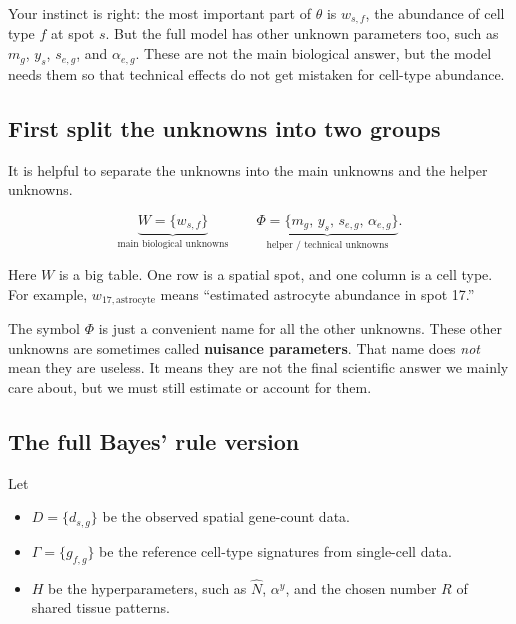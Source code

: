 \documentclass[11pt]{article}
\newcommand{\term}[1]{\textbf{#1}}
\begin{document}
\begin{bigidea}
Your instinct is right: the most important part of \(\theta\) is \(w_{s,f}\), the abundance of cell type \(f\) at spot \(s\). But the full model has other unknown parameters too, such as \(m_g\), \(y_s\), \(s_{e,g}\), and \(\alpha_{e,g}\). These are not the main biological answer, but the model needs them so that technical effects do not get mistaken for cell-type abundance.
\end{bigidea}

\subsection{First split the unknowns into two groups}

It is helpful to separate the unknowns into the main unknowns and the helper unknowns.

\begin{mathbox}
\[
\underbrace{W=\{w_{s,f}\}}_{\text{main biological unknowns}}
\qquad
\underbrace{\Phi=\{m_g,\,y_s,\,s_{e,g},\,\alpha_{e,g}\}}_{\text{helper / technical unknowns}}.
\]
\end{mathbox}

Here \(W\) is a big table. One row is a spatial spot, and one column is a cell type.
For example, \(w_{17,\mathrm{astrocyte}}\) means ``estimated astrocyte abundance in spot 17.''

The symbol \(\Phi\) is just a convenient name for all the other unknowns. These other unknowns are sometimes called \term{nuisance parameters}. That name does \emph{not} mean they are useless. It means they are not the final scientific answer we mainly care about, but we must still estimate or account for them.

\subsection{The full Bayes' rule version}

Let

\begin{itemize}
  \item \(D=\{d_{s,g}\}\) be the observed spatial gene-count data.
  \item \(\Gamma=\{g_{f,g}\}\) be the reference cell-type signatures from single-cell data.
  \item \(H\) be the hyperparameters, such as \(\hat N\), \(\alpha^y\), and the chosen number \(R\) of shared tissue patterns.
\end{itemize}
\end{document}
